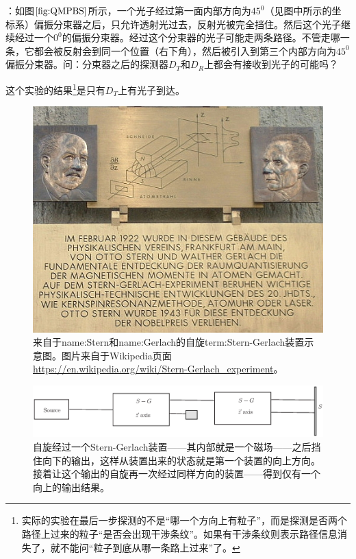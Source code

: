 \documentclass{ctexbook}
\newcommand{\ExpLabel}[1]{\label{#1}}
\newcommand{\FigLabel}[1]{\label{#1}}
\newcommand{\FigRef}[1]{图$\ref{#1}$}
\begin{document}
\begin{Experiment}
：如\FigRef{fig:QMPBS}所示，一个光子经过第一面内部方向为$45^{0}$（见图中所示的坐标系）偏振分束器之后，只允许透射光过去，反射光被完全挡住。然后这个光子继续经过一个$0^{0}$的偏振分束器。经过这个分束器的光子可能走两条路径。不管走哪一条，它都会被反射会到同一个位置（右下角），然后被引入到第三个内部方向为$45^{0}$偏振分束器。问：分束器之后的探测器$D_{T}$和$D_{R}$上都会有接收到光子的可能吗？

这个实验的结果\footnote{实际的实验在最后一步探测的不是“哪一个方向上有粒子”，而是探测是否两个路径上过来的粒子“是否会出现干涉条纹”\cite{Lukishova:Rochester}。如果有干涉条纹则表示路径信息消失了，就不能问“粒子到底从哪一条路上过来”了。}是只有$D_{T}$上有光子到达。
\ExpLabel{exp:photonwhichway}
\end{Experiment}
\begin{figure}
\includegraphics[width=12cm]{figure/SternGerlach2}
\caption[自旋的Stern-Gerlach装置]{来自于\gls{name:Stern}和\gls{name:Gerlach}的自旋\gls{term:Stern-Gerlach装置}示意图。图片来自于Wikipedia页面\url{https://en.wikipedia.org/wiki/Stern-Gerlach_experiment}。}
\FigLabel{fig:SternGerlach}
\end{figure}

\begin{figure}
\includegraphics[width=12cm]{figure/SG.eps}
\caption[自旋过Stern-Gerlach装置示意图]{自旋经过一个Stern-Gerlach装置——其内部就是一个磁场——之后挡住向下的输出，这样从装置出来的状态就是第一个装置的向上方向。接着让这个输出的自旋再一次经过同样方向的装置——得到仅有一个向上的输出结果。}
\FigLabel{fig:SGSzSz}
\end{figure}
\end{document}
